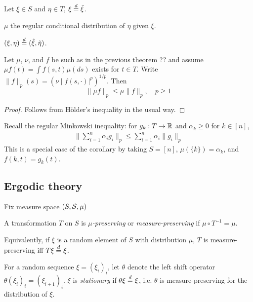 
Let $\xi \in S$ and $\eta \in T$, $\xi \overset{d}{=} \tilde{\xi}$.

$\mu$ the regular conditional distribution of $\eta$ given $\xi$.

$(\xi, \eta) \overset{d}{=} (\tilde{\xi}, \tilde{\eta})$.

\begin{theorem}
\end{theorem}

\todo{}
\begin{corollary}
  Let $\mu$, $\nu$, and $f$ be such as in the previous theorem ??
  and assume
  $\mu f(t) = \int f(s,t) \mu(ds)$ exists for $t \in T$.
  Write $\|f\|_p(s) = (\nu \mid f(s, \cdot)\rvert^p)^{1/p}$.
  Then
  \[
    \|\mu f\|_p \leq \mu \|f\|_p, \quad p \geq 1
  \]
\end{corollary}

\begin{proof}
  Follows from H\"older's inequality in the usual way.
\end{proof}

Recall the regular Minkowski inequality: for $g_k : T \to \mathbb{R}$ and
$\alpha_k \geq 0$ for $k \in [n]$,
\begin{align*}
  \| \sum^{n}_{i=1} \alpha_i g_i \|_p \leq \sum^{n}_{i=1} \alpha_i \|g_i\|_p
\end{align*}
This is a special case of the corollary by taking $S = [n]$,
$\mu(\{k\}) = \alpha_k$, and $f(k,t) = g_k(t)$.

\subsection{Ergodic theory}
\label{sub:Ergodic theory}

Fix measure space $(S, \mathcal{S}, \mu)$

\begin{definition}
  A transformation $T$ on $S$ is \emph{$\mu$-preserving} or
  \emph{measure-preserving} if $\mu \circ T^{-1} = \mu$.

  Equivalently, if $\xi$ is a random element of $S$ with distribution $\mu$,
  $T$ is measure-preserving iff $T \xi \overset{d}{=} \xi$.
\end{definition}

\begin{example}
  For a random sequence $\xi = (\xi_i)_i$,
  let $\theta$ denote the left shift operator
  $\theta (\xi_i)_i = (\xi_{i+1})_i$.
  $\xi$ is \emph{stationary} if $\theta \xi \overset{d}{=} \xi$,
  i.e. $\theta$ is measure-preserving for the distribution of $\xi$.
\end{example}

